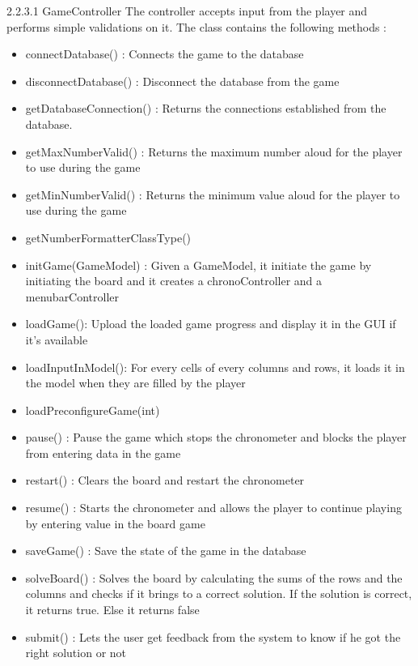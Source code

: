 \documentclass[12pt]{article}
\begin{document}
2.2.3.1 GameController\newline
The controller accepts input from the player and performs simple validations on it. The class contains the following methods : \newline
\begin{itemize}
\item connectDatabase() : Connects the game to the database
\item disconnectDatabase() : Disconnect the database from the game
\item getDatabaseConnection() : Returns the connections established from the database.
\item getMaxNumberValid() : Returns the maximum number aloud for the player to use during the game
\item getMinNumberValid() : Returns the minimum value aloud for the player to use during the game
\item getNumberFormatterClassType()
\item initGame(GameModel) : Given a GameModel, it initiate the game by initiating the board and it creates a chronoController and a menubarController
\item loadGame(): Upload the loaded game progress and display it in the GUI if it's available
\item loadInputInModel(): For every cells of every columns and rows, it loads it in the model when they are filled by the player
\item loadPreconfigureGame(int)
\item pause() : Pause the game which stops the chronometer and blocks the player from entering data in the game
\item restart() : Clears the board and restart the chronometer
\item resume() : Starts the chronometer and allows the player to continue playing by entering value in the board game
\item saveGame() : Save the state of the game in the database
\item solveBoard() : Solves the board by calculating the sums of the rows and the columns and checks if it brings to a correct solution. If the solution is correct, it returns true. Else it returns false
\item submit() : Lets the user get feedback from the system to know if he got the right solution or not \newline
\end{itemize}
\end{document}
